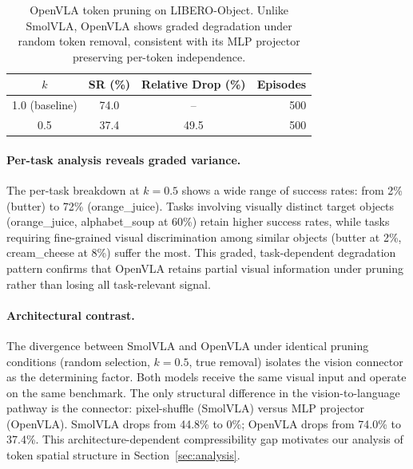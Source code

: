 \begin{table}[t]
\centering
\small
\caption{OpenVLA token pruning on LIBERO-Object. Unlike SmolVLA, OpenVLA shows graded degradation under random token removal, consistent with its MLP projector preserving per-token independence.}
\label{tab:openvla_degradation}
\begin{tabular}{cccr}
\toprule
$k$ & SR (\%) & Relative Drop (\%) & Episodes \\
\midrule
1.0 (baseline) & 74.0 & -- & 500 \\
0.5 & 37.4 & 49.5 & 500 \\
\bottomrule
\end{tabular}
\end{table}

\paragraph{Per-task analysis reveals graded variance.}
The per-task breakdown at $k{=}0.5$ shows a wide range of success rates: from 2\% (butter) to 72\% (orange\_juice). Tasks involving visually distinct target objects (orange\_juice, alphabet\_soup at 60\%) retain higher success rates, while tasks requiring fine-grained visual discrimination among similar objects (butter at 2\%, cream\_cheese at 8\%) suffer the most. This graded, task-dependent degradation pattern confirms that OpenVLA retains partial visual information under pruning rather than losing all task-relevant signal.

\paragraph{Architectural contrast.}
The divergence between SmolVLA and OpenVLA under identical pruning conditions (random selection, $k{=}0.5$, true removal) isolates the vision connector as the determining factor. Both models receive the same visual input and operate on the same benchmark. The only structural difference in the vision-to-language pathway is the connector: pixel-shuffle (SmolVLA) versus MLP projector (OpenVLA). SmolVLA drops from 44.8\% to 0\%; OpenVLA drops from 74.0\% to 37.4\%. This architecture-dependent compressibility gap motivates our analysis of token spatial structure in Section~\ref{sec:analysis}.
